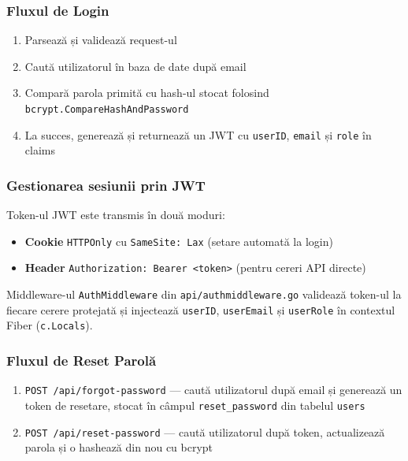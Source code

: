 \documentclass[12pt]{article}
\begin{document}
\subsubsection*{Fluxul de Login}

\begin{enumerate}
    \item Parsează și validează request-ul
    \item Caută utilizatorul în baza de date după email
    \item Compară parola primită cu hash-ul stocat folosind \texttt{bcrypt.CompareHashAndPassword}
    \item La succes, generează și returnează un JWT cu \texttt{userID}, \texttt{email} și \texttt{role} în claims
\end{enumerate}

\subsubsection*{Gestionarea sesiunii prin JWT}

Token-ul JWT este transmis în două moduri:
\begin{itemize}
    \item \textbf{Cookie} \texttt{HTTPOnly} cu \texttt{SameSite: Lax} (setare automată la login)
    \item \textbf{Header} \texttt{Authorization: Bearer <token>} (pentru cereri API directe)
\end{itemize}

Middleware-ul \texttt{AuthMiddleware} din \texttt{api/authmiddleware.go} validează token-ul
la fiecare cerere protejată și injectează \texttt{userID}, \texttt{userEmail} și \texttt{userRole}
în contextul Fiber (\texttt{c.Locals}).

\subsubsection*{Fluxul de Reset Parolă}

\begin{enumerate}
    \item \texttt{POST /api/forgot-password} --- caută utilizatorul după email și generează
    un token de resetare, stocat în câmpul \texttt{reset\_password} din tabelul \texttt{users}
    \item \texttt{POST /api/reset-password} --- caută utilizatorul după token, actualizează
    parola și o hashează din nou cu bcrypt
\end{enumerate}
\end{document}
